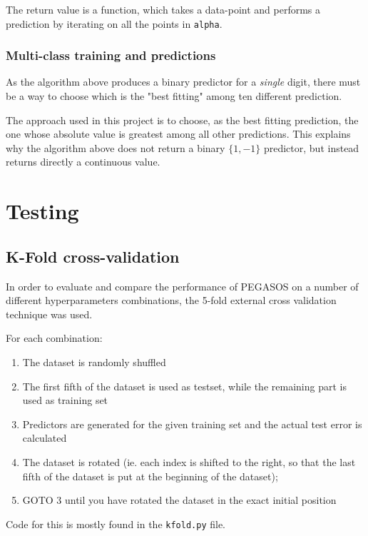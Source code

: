 \documentclass[a4paper]{article}
\begin{document}
The return value is a function, which takes a data-point and performs a prediction by iterating on all the points in \texttt{alpha}. 

\subsubsection{Multi-class training and predictions}
\label{sec:org27041b7}

As the algorithm above produces a binary predictor for a \emph{single} digit, there must be a way to choose which is the "best fitting" among ten different prediction.

The approach used in this project is to choose, as the best fitting prediction, the one whose absolute value is greatest among all other predictions. This explains why the algorithm above does not return a binary \(\{1, -1\}\) predictor, but instead returns directly a continuous value.

\section{Testing}
\label{sec:orgbc6d6c3}

\subsection{K-Fold cross-validation}
\label{sec:org24e3662}

In order to evaluate and compare the performance of PEGASOS on a number of different hyperparameters combinations, the 5-fold external cross validation technique was used.

For each combination:

\begin{enumerate}
\item The dataset is randomly shuffled
\item The first fifth of the dataset is used as testset, while the remaining part is used as training set
\item Predictors are generated for the given training set and the actual test error is calculated
\item The dataset is rotated (ie. each index is shifted to the right, so that the last fifth of the dataset is put at the beginning of the dataset);
\item GOTO 3 until you have rotated the dataset in the exact initial position
\end{enumerate}

Code for this is mostly found in the \texttt{kfold.py} file.
\end{document}
